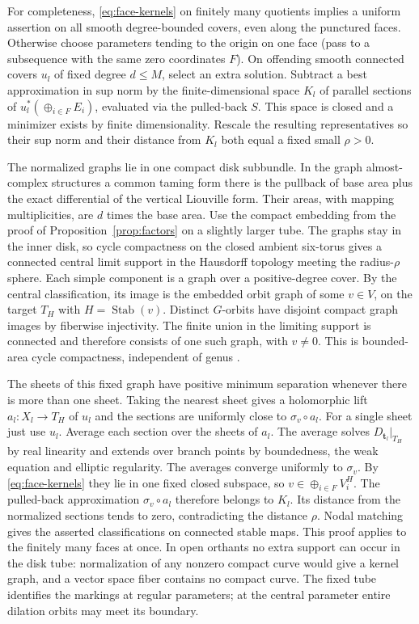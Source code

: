 For completeness, \eqref{eq:face-kernels} on finitely many quotients implies a uniform assertion on all smooth degree-bounded covers, even along the punctured faces. Otherwise choose parameters tending to the origin on one face (pass to a subsequence with the same zero coordinates \(F\)). On offending smooth connected covers \(u_l\) of fixed degree \(d\le M\), select an extra solution. Subtract a best approximation in sup norm by the finite-dimensional space \(K_l\) of parallel sections of \(u_l^*(\oplus_{i\in F}E_i)\), evaluated via the pulled-back \(S\). This space is closed and a minimizer exists by finite dimensionality. Rescale the resulting representatives so their sup norm and their distance from \(K_l\) both equal a fixed small \(\rho>0\).

The normalized graphs lie in one compact disk subbundle. In the graph almost-complex structures a common taming form there is the pullback of base area plus the exact differential of the vertical Liouville form. Their areas, with mapping multiplicities, are \(d\) times the base area. Use the compact embedding from the proof of Proposition~\ref{prop:factors} on a slightly larger tube. The graphs stay in the inner disk, so cycle compactness on the closed ambient six-torus gives a connected central limit support in the Hausdorff topology meeting the radius-\(\rho\) sphere. Each simple component is a graph over a positive-degree cover. By the central classification, its image is the embedded orbit graph of some \(v\in V\), on the target \(T_H\) with \(H=\operatorname{Stab}(v)\). Distinct \(G\)-orbits have disjoint compact graph images by fiberwise injectivity. The finite union in the limiting support is connected and therefore consists of one such graph, with \(v\ne0\). This is bounded-area cycle compactness, independent of genus \cite[Theorem~2.11]{diw}.

The sheets of this fixed graph have positive minimum separation whenever there is more than one sheet. Taking the nearest sheet gives a holomorphic lift \(a_l:X_l\to T_H\) of \(u_l\) and the sections are uniformly close to \(\sigma_v\circ a_l\). For a single sheet just use \(u_l\). Average each section over the sheets of \(a_l\). The average solves \(D_{\mathbf t_l}|_{T_H}\) by real linearity and extends over branch points by boundedness, the weak equation and elliptic regularity. The averages converge uniformly to \(\sigma_v\). By \eqref{eq:face-kernels} they lie in one fixed closed subspace, so \(v\in\oplus_{i\in F}V_i^H\). The pulled-back approximation \(\sigma_v\circ a_l\) therefore belongs to \(K_l\). Its distance from the normalized sections tends to zero, contradicting the distance \(\rho\). Nodal matching gives the asserted classifications on connected stable maps. This proof applies to the finitely many faces at once. In open orthants no extra support can occur in the disk tube: normalization of any nonzero compact curve would give a kernel graph, and a vector space fiber contains no compact curve. The fixed tube identifies the markings at regular parameters; at the central parameter entire dilation orbits may meet its boundary.
